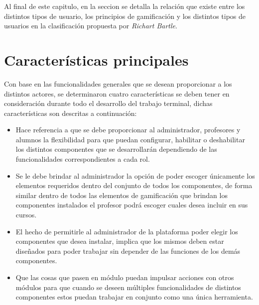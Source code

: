     \noindent
    Al final de este capitulo, en la seccion  se detalla
    la relación que existe entre los distintos tipos de usuario, los principios de
    gamificación y los distintos tipos de usuarios en la clasificación propuesta por
    {\it Richart Bartle}.


\section{Características principales}

 Con base en las funcionalidades generales que se desean proporcionar a los distintos
 actores, se determinaron cuatro características se deben tener en consideración durante
 todo el desarrollo del trabajo terminal, dichas características son descritas a continuación:


    \begin{multicols}{2}
    \begin{itemize}

    \item[] Hace referencia a que se debe proporcionar al administrador, profesores
            y alumnos la flexibilidad para que puedan configurar, habilitar o deshabilitar
            los distintos componentes que se desarrollarán dependiendo de las funcionalidades
            correspondientes a cada rol.


    \item[] Se le debe brindar al administrador la opción de poder escoger únicamente los
            elementos requeridos dentro del conjunto de todos los componentes, de forma similar
            dentro de todos las elementos de gamificación que brindan los componentes instalados
            el profesor podrá escoger cuales desea incluir en sus cursos.



    \item[] El hecho de permitirle al administrador de la plataforma poder elegir los
            componentes que desea instalar, implica que los mismos deben estar diseñados
            para poder trabajar sin depender de las funciones de los demás componentes.


    \item[] Que las cosas que pasen en módulo puedan impulsar acciones con otros módulos
            para que cuando se deseen múltiples funcionalidades de distintos componentes
            estos puedan trabajar en conjunto como una única herramienta.
    \end{itemize}
    \end{multicols}
